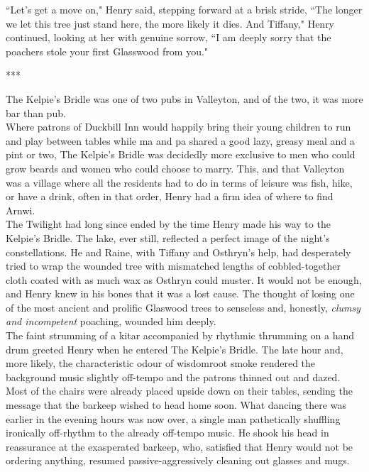 ``Let's get a move on," Henry said, stepping forward at a brisk stride, ``The longer we let this tree just stand here, the more likely it dies. And Tiffany," Henry continued, looking at her with genuine sorrow, ``I am deeply sorry that the poachers stole your first Glasswood from you."

\begin{center}
    ***
\end{center}

The Kelpie's Bridle was one of two pubs in Valleyton, and of the two, it was more bar than pub.\\
Where patrons of Duckbill Inn would happily bring their young children to run and play between tables while ma and pa shared a good lazy, greasy meal and a pint or two, The Kelpie's Bridle was decidedly more exclusive to men who could grow beards and women who could choose to marry.
This, and that Valleyton was a village where all the residents had to do in terms of leisure was fish, hike, or have a drink, often in that order, Henry had a firm idea of where to find Arnwi.\\

The Twilight had long since ended by the time Henry made his way to the Kelpie's Bridle. 
The lake, ever still, reflected a perfect image of the night's constellations.
He and Raine, with Tiffany and Osthryn's help, had desperately tried to wrap the wounded tree with mismatched lengths of cobbled-together cloth coated with as much wax as Osthryn could muster.
It would not be enough, and Henry knew in his bones that it was a lost cause. 
The thought of losing one of the most ancient and prolific Glaswood trees to senseless and, honestly, \textit{clumsy and incompetent} poaching, wounded him deeply.\\

The faint strumming of a kitar accompanied by rhythmic thrumming on a hand drum greeted Henry when he entered The Kelpie's Bridle. 
The late hour and, more likely, the characteristic odour of wisdomroot smoke rendered the background music slightly off-tempo and the patrons thinned out and dazed.
Most of the chairs were already placed upside down on their tables, sending the message that the barkeep wished to head home soon.
What dancing there was earlier in the evening hours was now over, a single man pathetically shuffling ironically off-rhythm to the already off-tempo music.
He shook his head in reassurance at the exasperated barkeep, who, satisfied that Henry would not be ordering anything, resumed passive-aggressively cleaning out glasses and mugs.\\

